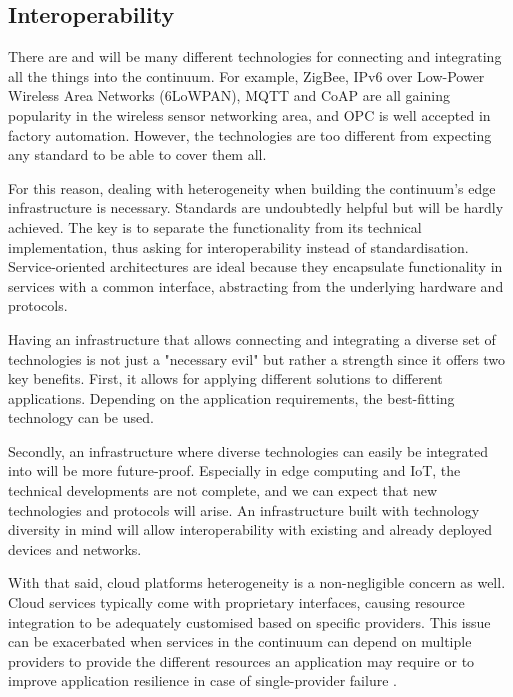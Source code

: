 \subsection{Interoperability}
\label{sec:interoperability}

There are and will be many different technologies for connecting and integrating all the things into the continuum. For example, ZigBee, IPv6 over Low-Power Wireless Area Networks (6LoWPAN), MQTT and CoAP \cite{naik2017choice} are all gaining popularity in the wireless sensor networking area, and OPC \cite{gruner2016restful} is well accepted in factory automation. However, the technologies are too different from expecting any standard to be able to cover them all.

For this reason, dealing with heterogeneity when building the continuum's edge infrastructure is necessary. Standards are undoubtedly helpful but will be hardly achieved. The key is to separate the functionality from its technical implementation, thus asking for interoperability instead of standardisation. Service-oriented architectures are ideal because they encapsulate functionality in services with a common interface, abstracting from the underlying hardware and protocols.

Having an infrastructure that allows connecting and integrating a diverse set of technologies is not just a "necessary evil" but rather a strength since it offers two key benefits. First, it allows for applying different solutions to different applications. Depending on the application requirements, the best-fitting technology can be used.

Secondly, an infrastructure where diverse technologies can easily be integrated into will be more future-proof. Especially in edge computing and IoT, the technical developments are not complete, and we can expect that new technologies and protocols will arise. An infrastructure built with technology diversity in mind will allow interoperability with existing and already deployed devices and networks.

With that said, cloud platforms heterogeneity is a non-negligible concern as well. Cloud services typically come with proprietary interfaces, causing resource integration to be adequately customised based on specific providers. This issue can be exacerbated when services in the continuum can depend on multiple providers to provide the different resources an application may require or to improve application resilience in case of single-provider failure \cite{grozev2014inter}.

